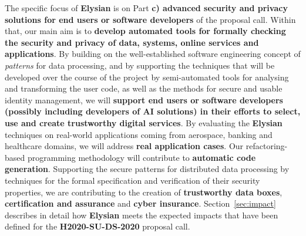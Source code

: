 \documentclass[a4paper,11pt]{article}
\newcommand{\project}[1]{\textbf{#1}\xspace}
\newcommand{\SECURITY}{\project{Elysian}}
\newcommand{\TheProject}{\SECURITY}
\begin{document}
The specific focus of \TheProject{} is on Part \textbf{c) advanced security and privacy solutions for end users or software developers} of the proposal call. Within that, our main aim is to \textbf{develop automated tools for formally checking the security and privacy of data, systems, online services and applications}. By building on the well-established software engineering concept of \emph{patterns} for data processing, and by supporting the techniques that will be developed over the course of the project by semi-automated tools for analysing and transforming the user code, as well as the methods for secure and usable identity management, we will \textbf{support end users or software developers (possibly including developers of AI solutions) in their efforts to select, use and create trustworthy digital services}. By evaluating the \TheProject{} techniques on real-world applications coming from aerospace, banking and healthcare domains, we will address \textbf{real application cases}. Our refactoring-based programming methodology will contribute to \textbf{automatic code generation}. Supporting the secure patterns for distributed data processing by techniques for the formal specification and verification of their security properties, we are contributing to the creation of \textbf{trustworthy data boxes}, \textbf{certification and assurance} and \textbf{cyber insurance}.
%
Section~\ref{sec:impact} describes in detail how \TheProject{} meets the expected impacts that have been defined for the \textbf{H2020-SU-DS-2020} proposal call.
\end{document}
